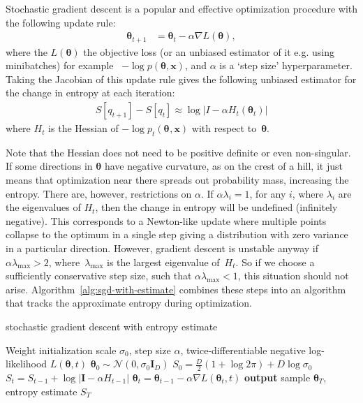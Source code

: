 \documentclass[]{article}
\newcommand{\vx}{\mathbf{x}}
\newcommand{\vr}{\mathbf{r}}
\newcommand{\vg}{\mathbf{g}}
\newcommand{\vI}{\mathbf{I}}
\newcommand{\tra}{^{\mathsf{T}}}
\newcommand{\N}[2]{\mathcal{N}\!\left(#1,#2\right)}
\newcommand{\data}{\vx}
\newcommand{\params}{\mathbf{\theta}}
\newcommand{\stepsize}{\alpha}
\newcommand{\gradparams}{\nabla L(\params_t, t)}
\newcommand{\entropy}{S}
\newcommand{\jointdist}{p(\params , \data)}
\newcommand{\subjointdist}[2]{p_{#1}(\params_{#2} , \data)}
\newcommand{\loss}{L(\params)}
\begin{document}
Stochastic gradient descent is a popular and effective optimization procedure with the following update rule:
%
\begin{align}
\params_{t+1} &=
  \params_t - \stepsize \nabla \loss,
\end{align}
%
where the $\loss$ the objective loss (or an unbiased estimator of it e.g. using minibatches)
for example ~$-\log\jointdist$, and $\stepsize$ is a `step size' hyperparameter.
Taking the Jacobian of this update rule gives the following unbiased estimator
for the change in entropy at each iteration:
%
\begin{align}
S[q_{t+1}] - S[q_t] \approx \log \left| I - \stepsize H_t(\params_t)
\right| \label{eq:exact hessian}
\end{align}
%
where $H_t$ is the Hessian of $-\log\subjointdist{t}{}$ with respect to~$\params$.

Note that the Hessian does not need to be positive definite or even non-singular.
If some directions in $\params$ have negative curvature, as on the crest of a hill, it just means that optimization near there spreads out probability mass, increasing the entropy.
There are, however, restrictions on $\stepsize$.
If ${\stepsize\lambda_i = 1}$, for any $i$, where $\lambda_i$ are the eigenvalues of $H_t$, then the change in entropy will be undefined (infinitely negative).
This corresponds to a Newton-like update where multiple points collapse to the optimum in a single step giving a distribution with zero variance in a particular direction.
However, gradient descent is unstable anyway if ${\stepsize\lambda_{\text{max}} > 2}$, where~$\lambda_{\text{max}}$ is the largest eigenvalue of~$H_t$.
So if we choose a sufficiently conservative step size, such that $\stepsize\lambda_{\text{max}} < 1$,
this situation should not arise.
Algorithm~\ref{alg:sgd-with-estimate} combines these steps into an algorithm that tracks the approximate entropy during optimization.

\begin{algorithm}[t]
   \caption{stochastic gradient descent with entropy estimate}
   \label{alg:sgd-with-estimate}
\begin{algorithmic}[1]
	Weight initialization scale $\sigma_0$, step size $\stepsize$,
	twice-differentiable negative log-likelihood $L(\params, t)$
	 $\params_0 \sim \N{0}{\sigma_0 \vI_D}$
	 $\entropy_{0} = \frac{D}{2} (1 + \log 2 \pi) + D \log\sigma_0$
		\State $\entropy_{t} = \entropy_{t-1} + \log \left| \vI - \stepsize H_{t-1} \right|$ \label{step:entropy-update}
		\State $\params_{t} = \params_{t-1} - \stepsize \gradparams$  	
   \EndFor
   \State \textbf{output} sample $\params_T$, entropy estimate $\entropy_T$
\end{algorithmic}
\end{algorithm}
%
\end{document}
